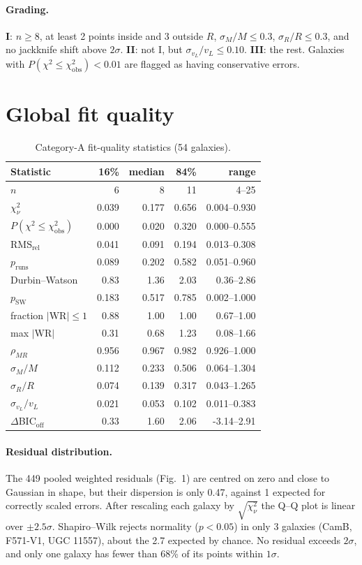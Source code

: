 \documentclass[10pt]{article}
\begin{document}
\paragraph{Grading.} \textbf{I}: $n\ge8$, at least 2 points inside and 3 outside $R$, $\sigma_M/M\le0.3$, $\sigma_R/R\le0.3$, and no jackknife shift above $2\sigma$. \textbf{II}: not I, but $\sigma_{v_L}/v_L\le0.10$. \textbf{III}: the rest. Galaxies with $P(\chi^2\le\chi^2_\mathrm{obs})<0.01$ are flagged as having conservative errors.

\section{Global fit quality}
\begin{table}[h]\centering\small\caption{Category-A fit-quality statistics (54 galaxies).}\begin{tabular}{lrrrr}\toprule Statistic & 16\% & median & 84\% & range\\\midrule
$n$ & 6 & 8 & 11 & 4--25\\
$\chi^2_\nu$ & 0.039 & 0.177 & 0.656 & 0.004--0.930\\
$P(\chi^2\le\chi^2_\mathrm{obs})$ & 0.000 & 0.020 & 0.320 & 0.000--0.555\\
RMS$_\mathrm{rel}$ & 0.041 & 0.091 & 0.194 & 0.013--0.308\\
$p_\mathrm{runs}$ & 0.089 & 0.202 & 0.582 & 0.051--0.960\\
Durbin--Watson & 0.83 & 1.36 & 2.03 & 0.36--2.86\\
$p_\mathrm{SW}$ & 0.183 & 0.517 & 0.785 & 0.002--1.000\\
fraction $|\mathrm{WR}|\le1$ & 0.88 & 1.00 & 1.00 & 0.67--1.00\\
max $|\mathrm{WR}|$ & 0.31 & 0.68 & 1.23 & 0.08--1.66\\
$\rho_{MR}$ & 0.956 & 0.967 & 0.982 & 0.926--1.000\\
$\sigma_M/M$ & 0.112 & 0.233 & 0.506 & 0.064--1.304\\
$\sigma_R/R$ & 0.074 & 0.139 & 0.317 & 0.043--1.265\\
$\sigma_{v_L}/v_L$ & 0.021 & 0.053 & 0.102 & 0.011--0.383\\
$\Delta$BIC$_\mathrm{off}$ & 0.33 & 1.60 & 2.06 & -3.14--2.91\\
\bottomrule\end{tabular}\end{table}
\paragraph{Residual distribution.} The 449 pooled weighted residuals (Fig.~1) are centred on zero and close to Gaussian in shape, but their dispersion is only 0.47, against 1 expected for correctly scaled errors. After rescaling each galaxy by $\sqrt{\chi^2_\nu}$ the Q--Q plot is linear over $\pm2.5\sigma$. Shapiro--Wilk rejects normality ($p<0.05$) in only 3 galaxies (CamB, F571-V1, UGC 11557), about the 2.7 expected by chance. No residual exceeds $2\sigma$, and only one galaxy has fewer than 68\% of its points within $1\sigma$.
\end{document}
